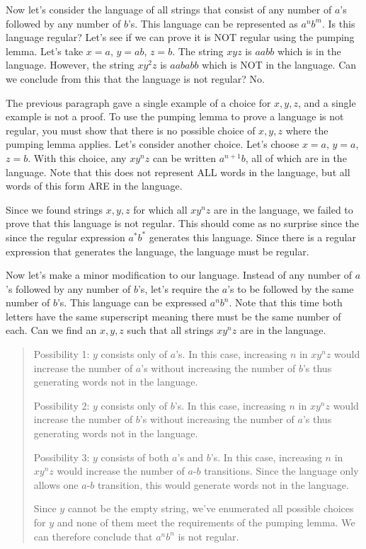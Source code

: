 \documentclass[letterpaper,12pt,openany,reqno]{book}%
\begin{document}
Now let's consider the language of all strings that consist of any number of $a$'s followed by any number of $b$'s. This language can be represented as $a^n b^m$. Is this language regular? Let's see if we can prove it is NOT regular using the pumping lemma. Let's take $x=a$, $y=ab$, $z=b$. The string $xyz$ is $aabb$ which is in the language. However, the string $xy^2 z$ is $aababb$ which is NOT in the language. Can we conclude from this that the language is not regular? No.

The previous paragraph gave a single example of a choice for $x, y, z$, and a single example is not a proof. To use the pumping lemma to prove a language is not regular, you must show that there is no possible choice of $x, y, z$ where the pumping lemma applies. Let's consider another choice. Let's choose $x=a$, $y=a$, $z=b$. With this choice, any $xy^n z$ can be written $a^{n+1} b$, all of which are in the language. Note that this does not represent ALL words in the language, but all words of this form ARE in the language. 

Since we found strings $x, y, z$ for which all $xy^nz$ are in the language, we failed to prove that this language is not regular. This should come as no surprise since the since the regular expression $a^*b^*$ generates this language. Since there is a regular expression that generates the language, the language must be regular.

Now let's make a minor modification to our language. Instead of any number of $a$'s followed by any number of $b$'s, let's require the $a$'s to be followed by the same number of $b$'s. This language can be expressed $a^nb^n$. Note that this time both letters have the same superscript meaning there must be the same number of each. Can we find an $x, y, z$ such that all strings $xy^nz$ are in the language.

\begin{quote}
Possibility 1: $y$ consists only of $a$'s. In this case, increasing $n$ in $xy^nz$ would increase the number of $a$'s without increasing the number of $b$'s thus generating words not in the language.

Possibility 2: $y$ consists only of $b$'s. In this case, increasing $n$ in $xy^nz$ would increase the number of $b$'s without increasing the number of $a$'s thus generating words not in the language.

Possibility 3: $y$ consists of both $a$'s and $b$'s. In this case, increasing $n$ in $xy^nz$ would increase the number of $a$-$b$ transitions. Since the language only allows one $a$-$b$ transition, this would generate words not in the language.

Since $y$ cannot be the empty string, we've enumerated all possible choices for $y$ and none of them meet the requirements of the pumping lemma. We can therefore conclude that $a^nb^n$ is not regular.
\end{quote}
\end{document}
